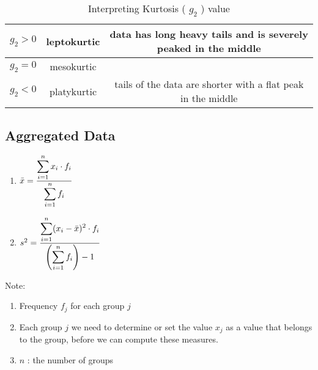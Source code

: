 \begin{customTableWrapper}{1.5}
\begin{table}[H]
    \centering
    \begin{tabular}{|c|c|c|}
        \hline
        $g_2 > 0$ & leptokurtic & data has long heavy tails and is severely peaked in the middle \\ \hline
        $g_2 = 0$ & mesokurtic & \\ \hline
        $g_2 < 0$ & platykurtic & tails of the data are shorter with a flat peak in the middle \\ \hline
    \end{tabular}
    \caption{Interpreting Kurtosis ( $g_2$ ) value}
\end{table}
\end{customTableWrapper}


\subsection{Aggregated Data \cite{ism-1}}\label{Aggregated Data}

\begin{enumerate}[itemsep=0.2cm]
    \item $
        \bar{x} = 
        \dfrac{
            \displaystyle\sum_{i=1}^{n} x_i \cdot f_i
        }{
            \displaystyle\sum_{i=1}^{n} f_i
        }
    $

    \item $
        s^2 = 
        \dfrac{
            \displaystyle\sum_{i=1}^{n} (x_i - \bar{x})^2 \cdot f_i
        }{
            \left(\displaystyle\sum_{i=1}^{n} f_i\right) - 1
        }
    $
\end{enumerate}

\vspace{1cm}

Note:
\begin{enumerate}
    \item Frequency $f_j$ for each group $j$
    \item Each group $j$ we need to determine or set the value $x_j$ as a value that belongs to the group, before we can compute these measures.
    \item $n$ : the number of groups
\end{enumerate}






















